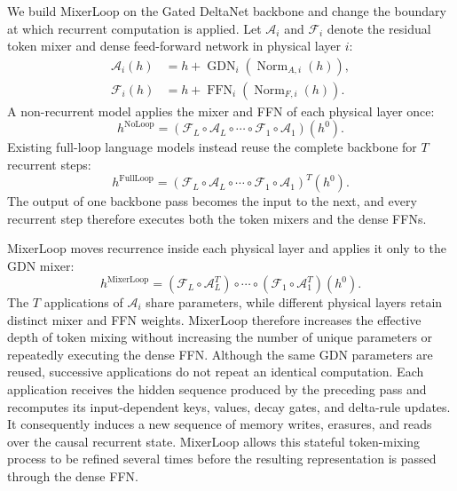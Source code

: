 \documentclass[letterpaper]{article} %
\newcommand{\Aop}{\mathcal{A}}
\newcommand{\Fop}{\mathcal{F}}
\begin{document}
We build MixerLoop on the Gated DeltaNet backbone and change the
boundary at which recurrent computation is applied. Let $\Aop_i$ and $\Fop_i$
denote the residual token mixer and dense feed-forward network in physical layer
$i$:
\begin{align}
\Aop_i(h)
&=
h+
\operatorname{GDN}_i\!\left(
\operatorname{Norm}_{A,i}(h)
\right),\\
\Fop_i(h)
&=
h+
\operatorname{FFN}_i\!\left(
\operatorname{Norm}_{F,i}(h)
\right).
\end{align}
A non-recurrent model applies the mixer and FFN of each physical layer once:
\begin{equation}
h^{\mathrm{NoLoop}}
=\left(
\Fop_L\circ\Aop_L\circ\cdots\circ
\Fop_1\circ\Aop_1
\right)(h^0).
\label{eq:noloop}
\end{equation}
Existing full-loop language models instead reuse the complete backbone for
$T$ recurrent steps:
\begin{equation}
h^{\mathrm{FullLoop}}
=\left(
\Fop_L\circ\Aop_L\circ\cdots\circ
\Fop_1\circ\Aop_1
\right)^T(h^0).
\label{eq:fullloop}
\end{equation}
The output of one backbone pass becomes the input to the next, and every
recurrent step therefore executes both the token mixers and the dense FFNs.

MixerLoop moves recurrence inside each physical layer and applies it only to
the GDN mixer:
\begin{equation}
h^{\mathrm{MixerLoop}}
=\left(\Fop_L\circ\Aop_L^T\right)\circ\cdots\circ
\left(\Fop_1\circ\Aop_1^T\right)(h^0).
\label{eq:mixerloop}
\end{equation}
The $T$ applications of $\Aop_i$ share parameters, while different physical layers retain distinct mixer and FFN weights. MixerLoop therefore increases the effective depth of token mixing without increasing the number of unique parameters or repeatedly executing the dense FFN. Although the same GDN parameters are reused, successive applications do not repeat an identical computation. Each application receives the hidden sequence produced by the preceding pass and recomputes its input-dependent keys, values, decay gates, and delta-rule updates. It consequently induces a new sequence of memory writes, erasures, and reads over the causal recurrent state. MixerLoop allows this stateful token-mixing process to be refined several times before the resulting representation is passed through the dense FFN.
\end{document}
